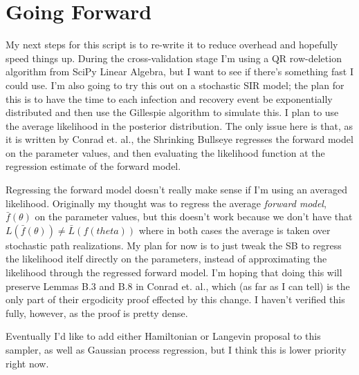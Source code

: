 \documentclass[12pt,a4paper]{article}
\begin{document}
\section{Going Forward}
My next steps for this script is to re-write it to reduce overhead and hopefully speed things up.  During the cross-validation stage I'm using a QR row-deletion algorithm from SciPy Linear Algebra, but I want to see if there's something fast I could use.  I'm also going to try this out on a stochastic SIR model; the plan for this is to have the time to each infection and recovery event be exponentially distributed and then use the Gillespie algorithm to simulate this.  I plan to use the average likelihood in the posterior distribution.  The only issue here is that, as it is written by Conrad et. al., the Shrinking Bullseye regresses the forward model on the parameter values, and then evaluating the likelihood function at the regression estimate of the forward model.

Regressing the forward model doesn't really make sense if I'm using an averaged likelihood.  Originally my thought was to regress the average \textit{forward model}, $\bar{f}(\theta)$ on the parameter values, but this doesn't work because we don't have that $L(\bar{f}(\theta)) \neq \bar{L}(f(theta))$ where in both cases the average is taken over stochastic path realizations.  My plan for now is to just tweak the SB to regress the likelihood itelf directly on the parameters, instead of approximating the likelihood through the regressed forward model.  I'm hoping that doing this will preserve Lemmas B.3 and B.8 in Conrad et. al., which (as far as I can tell) is the only part of their ergodicity proof effected by this change.  I haven't verified this fully, however, as the proof is pretty dense.

Eventually I'd like to add either Hamiltonian or Langevin proposal to this sampler, as well as Gaussian process regression, but I think this is lower priority right now.
\end{document}
